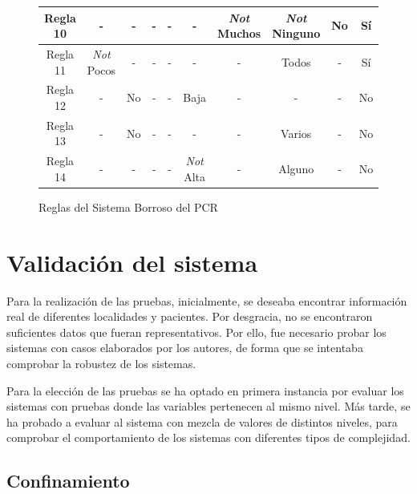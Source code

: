 \documentclass[12pt,a4paper, xcolor=table]{article}
\begin{document}
\begin{figure}[!h]
\begin{adjustwidth}{-1.4cm}{}
\begin{tabular}{c|c|c|c|c|c|c|c|c|c|}
\multicolumn{1}{|c|}{Regla 10} & - & - & - & - & - & \textit{Not} Muchos & \textit{Not} Ninguno & No & Sí \\ \hline
\multicolumn{1}{|c|}{Regla 11} & \textit{Not} Pocos & - & - & - & - & - & Todos & - & Sí \\ \hline
\multicolumn{1}{|c|}{Regla 12} & - & No & - & - & Baja & - & - & - & No \\ \hline
\multicolumn{1}{|c|}{Regla 13} & - & No & - & - & - & - & Varios & - & No \\ \hline
\multicolumn{1}{|c|}{Regla 14} & - & - & - & - & \textit{Not} Alta & - & Alguno & - & No \\ \hline
\end{tabular}
\end{adjustwidth}
\caption{Reglas del Sistema Borroso del PCR}
\end{figure}


\newpage

\section{Validación del sistema}

Para la realización de las pruebas, inicialmente, se deseaba encontrar información real de diferentes localidades\cite{cant, cana} y pacientes. Por desgracia, no se encontraron suficientes datos que fueran representativos. Por ello, fue necesario probar los sistemas con casos elaborados por los autores, de forma que se intentaba comprobar la robustez de los sistemas.

\vspace{3mm}

Para la elección de las pruebas se ha optado en primera instancia por evaluar los sistemas con pruebas donde las variables pertenecen al mismo nivel. Más tarde, se ha probado a evaluar al sistema con mezcla de valores de distintos niveles, para comprobar el comportamiento de los sistemas con diferentes tipos de complejidad.

  \subsection{Confinamiento}
\end{document}
